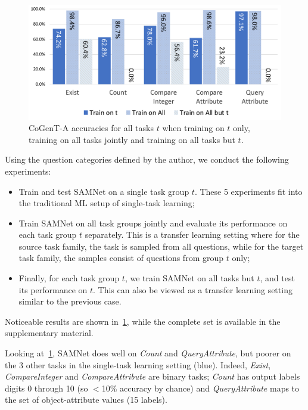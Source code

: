 \begin{figure}[htbp]
	\centering
	\includegraphics[width=\columnwidth]{../img/plots/cogent_reasoning_transfer.pdf}
	\caption{CoGenT-A accuracies for all tasks $t$ when training on $t$ only, training on all tasks jointly and training on all tasks but $t$.}
	\label{fig:CoGenT-results}
\end{figure}

Using the question categories defined by the author, we conduct the following experiments:
\begin{itemize}
	\compresslist
	\item Train and test SAMNet on a single task group $t$. These 5 experiments fit into the traditional ML setup of single-task learning;
	\item Train SAMNet on all task groups jointly and evaluate its performance on each task group $t$ separately.
	This is a transfer learning setting where for the source task family, the task is sampled from all questions, while for the target task family, the samples consist of questions from group $t$ only;
	\item Finally, for each task group $t$, we train SAMNet on all tasks but $t$, and test its performance on $t$. This can also be viewed as a transfer learning setting similar to the previous case.
\end{itemize}

Noticeable results are shown in~\cref{fig:CoGenT-results}, while the complete set is available in the supplementary material.

Looking at~\cref{fig:CoGenT-results}, SAMNet does well on \textit{Count} and \textit{QueryAttribute}, but poorer on the 3 other tasks in the single-task learning setting (blue). Indeed, \textit{Exist}, \textit{CompareInteger} and \textit{CompareAttribute} are binary tasks; \textit{Count} has output labels digits 0 through 10 (so $<$10\% accuracy by chance) and \textit{QueryAttribute} maps to the set of object-attribute values (15 labels).

